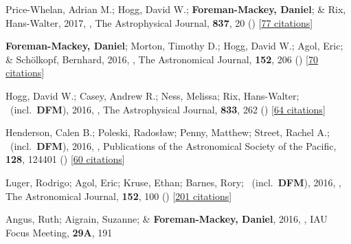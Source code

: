 \item[{\color{numcolor}\scriptsize25}] Price-Whelan, Adrian M.; Hogg, David W.; \textbf{Foreman-Mackey, Daniel}; \& Rix, Hans-Walter, 2017, , The Astrophysical Journal, \textbf{837}, 20 () [\href{https://ui.adsabs.harvard.edu/abs/2017ApJ...837...20P}{77 citations}]

\item[{\color{numcolor}\scriptsize24}] \textbf{Foreman-Mackey, Daniel}; Morton, Timothy D.; Hogg, David W.; Agol, Eric; \& Sch{\"o}lkopf, Bernhard, 2016, , The Astronomical Journal, \textbf{152}, 206 () [\href{https://ui.adsabs.harvard.edu/abs/2016AJ....152..206F}{70 citations}]

\item[{\color{numcolor}\scriptsize23}] Hogg, David W.; Casey, Andrew R.; Ness, Melissa; Rix, Hans-Walter; \etal\ (incl.\ \textbf{DFM}), 2016, , The Astrophysical Journal, \textbf{833}, 262 () [\href{https://ui.adsabs.harvard.edu/abs/2016ApJ...833..262H}{64 citations}]

\item[{\color{numcolor}\scriptsize22}] Henderson, Calen B.; Poleski, Rados{\l}aw; Penny, Matthew; Street, Rachel A.; \etal\ (incl.\ \textbf{DFM}), 2016, , Publications of the Astronomical Society of the Pacific, \textbf{128}, 124401 () [\href{https://ui.adsabs.harvard.edu/abs/2016PASP..128l4401H}{60 citations}]

\item[{\color{numcolor}\scriptsize21}] Luger, Rodrigo; Agol, Eric; Kruse, Ethan; Barnes, Rory; \etal\ (incl.\ \textbf{DFM}), 2016, , The Astronomical Journal, \textbf{152}, 100 () [\href{https://ui.adsabs.harvard.edu/abs/2016AJ....152..100L}{201 citations}]

\item[{\color{numcolor}\scriptsize20}] Angus, Ruth; Aigrain, Suzanne; \& \textbf{Foreman-Mackey, Daniel}, 2016, , IAU Focus Meeting, \textbf{29A}, 191

